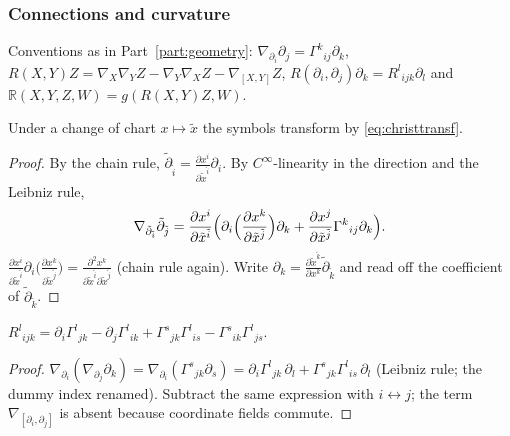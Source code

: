 \subsubsection*{Connections and curvature}

Conventions as in Part~\ref{part:geometry}: $\nabla_{\partial_i}\partial_j=\Gamma^k{}_{ij}\partial_k$, $R(X,Y)Z=\nabla_X\nabla_YZ-\nabla_Y\nabla_XZ-\nabla_{[X,Y]}Z$,
$R(\partial_i,\partial_j)\partial_k=R^l{}_{ijk}\partial_l$ and $\mathbb R(X,Y,Z,W)=g(R(X,Y)Z,W)$.

\begin{identity}\label{id:gammatrans}
Under a change of chart $x\mapsto\tilde x$ the symbols transform by \eqref{eq:christtransf}.
\end{identity}
\begin{proof}
 By the chain rule, $\tilde\partial_{\tilde i}=\frac{\partial x^i}{\partial\tilde x^{\tilde i}}\partial_i$.
 By $C^\infty$-linearity in the direction and the Leibniz rule,
\[
\nabla_{\tilde\partial_{\tilde i}}\tilde\partial_{\tilde j}=\frac{\partial x^i}{\partial\tilde x^{\tilde i}}\Bigl(\partial_i\Bigl(\frac{\partial x^k}{\partial\tilde x^{\tilde j}}\Bigr)\partial_k+\frac{\partial x^j}{\partial\tilde x^{\tilde j}}\Gamma^k{}_{ij}\partial_k\Bigr).
\]
 $\frac{\partial x^i}{\partial\tilde x^{\tilde i}}\partial_i\bigl(\frac{\partial x^k}{\partial\tilde x^{\tilde j}}\bigr)=\frac{\partial^2x^k}{\partial\tilde x^{\tilde i}\partial\tilde x^{\tilde j}}$ (chain rule again).
 Write $\partial_k=\frac{\partial\tilde x^{\tilde k}}{\partial x^k}\tilde\partial_{\tilde k}$ and read off the coefficient of $\tilde\partial_{\tilde k}$.
\end{proof}

\begin{identity}\label{id:riemanncomp}
$R^l{}_{ijk}=\partial_i\Gamma^l{}_{jk}-\partial_j\Gamma^l{}_{ik}+\Gamma^s{}_{jk}\Gamma^l{}_{is}-\Gamma^s{}_{ik}\Gamma^l{}_{js}$.
\end{identity}
\begin{proof}
 $\nabla_{\partial_i}(\nabla_{\partial_j}\partial_k)=\nabla_{\partial_i}(\Gamma^s{}_{jk}\partial_s)=\partial_i\Gamma^l{}_{jk}\,\partial_l+\Gamma^s{}_{jk}\Gamma^l{}_{is}\,\partial_l$ (Leibniz rule; the dummy index renamed).
 Subtract the same expression with $i\leftrightarrow j$; the term $\nabla_{[\partial_i,\partial_j]}$ is absent because coordinate fields commute.
\end{proof}

